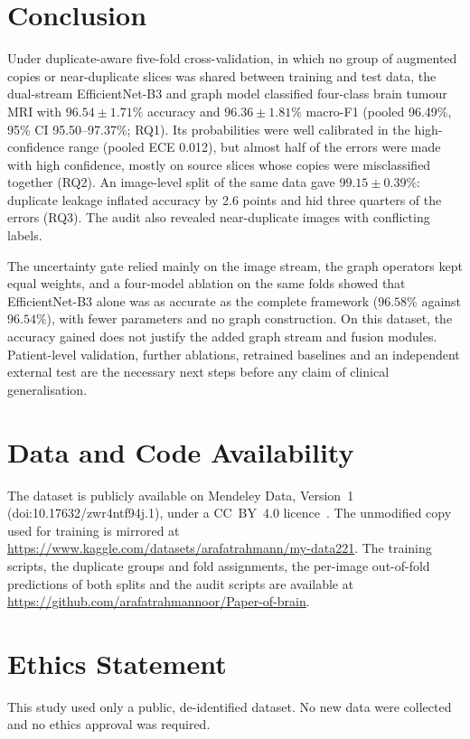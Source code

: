 \documentclass[journal,onecolumn]{IEEEtran}
\begin{document}
\section{Conclusion}
Under duplicate-aware five-fold cross-validation, in which no group of augmented copies or near-duplicate slices was shared between training and test data, the dual-stream EfficientNet-B3 and graph model classified four-class brain tumour MRI with $96.54 \pm 1.71\%$ accuracy and $96.36 \pm 1.81\%$ macro-F1 (pooled 96.49\%, 95\% CI 95.50--97.37\%; RQ1). Its probabilities were well calibrated in the high-confidence range (pooled ECE 0.012), but almost half of the errors were made with high confidence, mostly on source slices whose copies were misclassified together (RQ2). An image-level split of the same data gave $99.15 \pm 0.39\%$: duplicate leakage inflated accuracy by 2.6 points and hid three quarters of the errors (RQ3). The audit also revealed near-duplicate images with conflicting labels.

The uncertainty gate relied mainly on the image stream, the graph operators kept equal weights, and a four-model ablation on the same folds showed that EfficientNet-B3 alone was as accurate as the complete framework ($96.58\%$ against $96.54\%$), with fewer parameters and no graph construction. On this dataset, the accuracy gained does not justify the added graph stream and fusion modules. Patient-level validation, further ablations, retrained baselines and an independent external test are the necessary next steps before any claim of clinical generalisation.

\section*{Data and Code Availability}
The dataset is publicly available on Mendeley Data, Version~1 (doi:10.17632/zwr4ntf94j.1), under a CC~BY~4.0 licence~\cite{hira2025mendeley}. The unmodified copy used for training is mirrored at \url{https://www.kaggle.com/datasets/arafatrahmann/my-data221}. The training scripts, the duplicate groups and fold assignments, the per-image out-of-fold predictions of both splits and the audit scripts are available at \url{https://github.com/arafatrahmannoor/Paper-of-brain}.

\section*{Ethics Statement}
This study used only a public, de-identified dataset. No new data were collected and no ethics approval was required.
\end{document}

